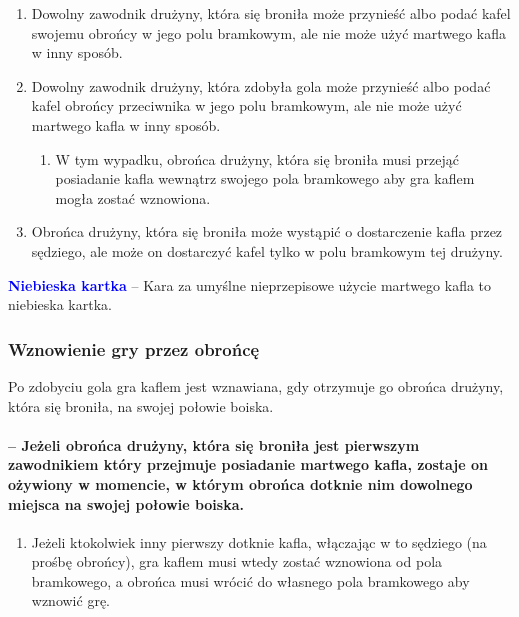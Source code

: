 \documentclass[12pt]{article}
\newcommand\bluecard[1]{\bgroup\textcolor{blue}{\textbf{#1}}}
\begin{document}
\begin{enumerate}
	\item
	      Dowolny zawodnik drużyny, która się broniła może przynieść albo podać
	      kafel swojemu obrońcy w jego polu bramkowym, ale nie może użyć
	      martwego kafla w inny sposób.
	\item
	      Dowolny zawodnik drużyny, która zdobyła gola może przynieść albo podać
	      kafel obrońcy przeciwnika w jego polu bramkowym, ale nie może użyć
	      martwego kafla w inny sposób.

	      \begin{enumerate}
		      \item
		            W tym wypadku, obrońca drużyny, która się broniła musi przejąć
		            posiadanie kafla wewnątrz swojego pola bramkowego aby gra kaflem
		            mogła zostać wznowiona.
	      \end{enumerate}
	\item
	      Obrońca drużyny, która się broniła może wystąpić o dostarczenie kafla
	      przez sędziego, ale może on dostarczyć kafel tylko w polu bramkowym
	      tej drużyny.
\end{enumerate}

\bluecard{Niebieska kartka} -- Kara za umyślne nieprzepisowe użycie martwego
kafla to niebieska kartka.

\subsubsection{Wznowienie gry przez obrońcę}
Po zdobyciu gola gra
kaflem jest wznawiana, gdy otrzymuje go obrońca drużyny, która się
broniła, na swojej połowie boiska.

\paragraph{ -- Jeżeli obrońca drużyny, która się broniła jest
	pierwszym zawodnikiem który przejmuje posiadanie martwego kafla, zostaje
	on ożywiony w momencie, w którym obrońca dotknie nim dowolnego miejsca
	na swojej połowie boiska.}

\begin{enumerate}
	\item
	      Jeżeli ktokolwiek inny pierwszy dotknie kafla, włączając w to sędziego
	      (na prośbę obrońcy), gra kaflem musi wtedy zostać wznowiona od pola
	      bramkowego, a obrońca musi wrócić do własnego pola bramkowego aby
	      wznowić grę.
\end{enumerate}
\end{document}
